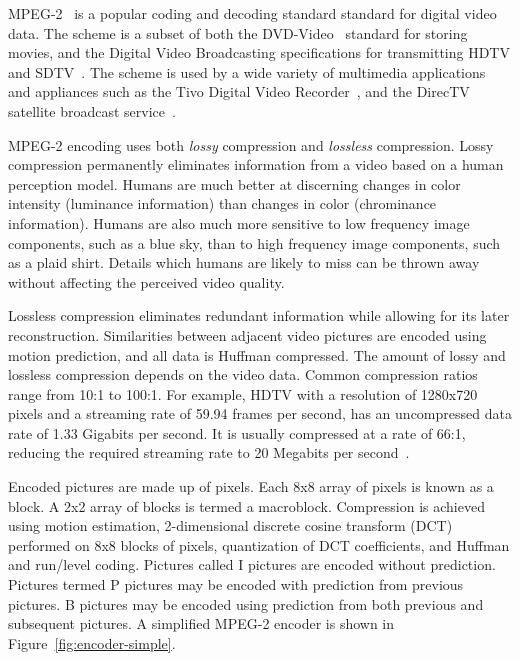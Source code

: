 
MPEG-2~\cite{MPEG2} is a popular coding and decoding standard standard
for digital video data. The scheme is a subset of both the
DVD-Video~\cite{DVDVideo} standard for storing movies, and the Digital
Video Broadcasting specifications for transmitting HDTV and
SDTV~\cite{DVB}. The scheme is used by a wide variety of multimedia
applications and appliances such as the Tivo Digital Video
Recorder~\cite{tivo}, and the DirecTV satellite broadcast
service~\cite{directv}.

MPEG-2 encoding uses both {\it lossy} compression and {\it lossless}
compression. Lossy compression permanently eliminates information from
a video based on a human perception model. Humans are much better at
discerning changes in color intensity (luminance information) than
changes in color (chrominance information). Humans are also much more
sensitive to low frequency image components, such as a blue sky, than
to high frequency image components, such as a plaid shirt. Details
which humans are likely to miss can be thrown away without affecting
the perceived video quality.

Lossless compression eliminates redundant information while allowing
for its later reconstruction. Similarities between adjacent video
pictures are encoded using motion prediction, and all data is Huffman
compressed\cite{Huffman52}. The amount of lossy and lossless
compression depends on the video data. Common compression ratios range
from 10:1 to 100:1. For example, HDTV with a resolution of 1280x720
pixels and a streaming rate of 59.94 frames per second, has an
uncompressed data rate of 1.33 Gigabits per second. It is usually
compressed at a rate of 66:1, reducing the required streaming rate to
20 Megabits per second~\cite{imagevidstandards, Page 3}.

Encoded pictures are made up of pixels. Each 8x8 array of pixels is
known as a block. A 2x2 array of blocks is termed a
macroblock. Compression is achieved using
motion estimation, 2-dimensional discrete cosine transform (DCT) performed
on 8x8 blocks of pixels, quantization of DCT coefficients, and Huffman
and run/level coding. Pictures called I pictures are encoded without
prediction. Pictures termed P pictures may be encoded with prediction
from previous pictures. B pictures may be encoded using prediction
from both previous and subsequent pictures. A simplified MPEG-2
encoder is shown in Figure~\ref{fig:encoder-simple}.

